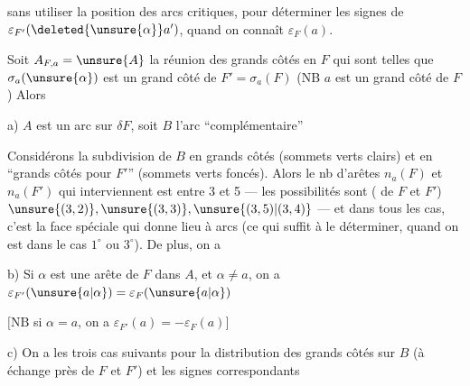 \uline{} sans utiliser la position des arcs critiques, pour déterminer les signes de \(\varepsilon_{F'}(\deleted{\unsure{\alpha}}a')\), quand on connaît  \(\varepsilon_F(a)\).


Soit \(A_{F,a}=\unsure{A}\) la réunion des grands côtés en \(F\) qui sont telles que \(\sigma_a(\unsure{\alpha})\) est un grand côté de \(F'=\sigma_a(F)\) (NB \(a\) est un grand côté de \(F\)) Alors

a) \(A\) est un arc sur \(\delta F\), soit \(B\) l'arc ``complémentaire''

 Considérons la subdivision de \(B\) en grands côtés (sommets verts clairs) et en ``grands côtés pour \(F'\)'' (sommets verts foncés). Alors le nb d'arêtes \(n_a(F)\) et \(n_a(F')\) qui interviennent est  entre 3 et 5 --- les possibilités sont ( de \(F\) et \(F'\)) \(\unsure{(3,2)},\unsure{(3,3)},\unsure{(3,5)|(3,4)}\)  --- et dans tous les cas, c'est la face spéciale qui donne lieu à  arcs (ce qui suffit à le déterminer, quand on est dans le cas \(1^\circ\) ou \(3^\circ\)). De plus, on a

b) Si \(\alpha\) est une arête de \(F\) dans \(A\),  et \(\alpha\ne a\), on a \(\varepsilon_{F'}(\unsure{a|\alpha})=\varepsilon_F(\unsure{a|\alpha})\)

\([\mathrm{NB}\) si \(\alpha=a\), on a \(\varepsilon_{F'}(a)=-\varepsilon_F(a)]\)

c) On a les  trois cas suivants pour la distribution des grands côtés sur \(B\) (à échange près de \(F\) et \(F'\)) et les signes correspondants

